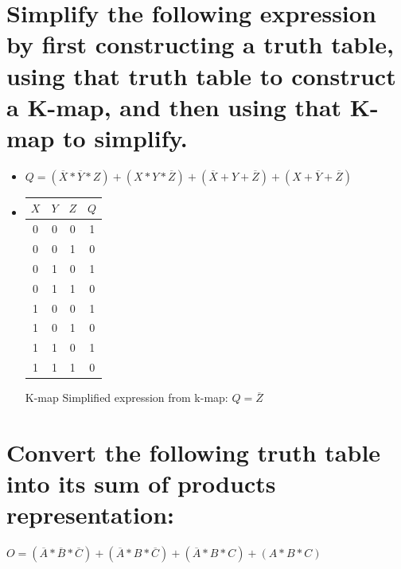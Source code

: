 \documentclass{article}
\begin{document}
\section{Simplify the following expression by first constructing a truth table, using that truth table to
construct a K-map, and then using that K-map to simplify.} 

\begin{itemize}
\large
    \item $Q = (\overline{X} * \overline{Y} * Z) + (X * Y * \overline{Z}) +
    (\overline{X} + Y + \overline{Z}) + (X + \overline{Y} + \overline{Z})$ \newline
    
  \item
    \begin{tabular}{ccC|c}
      $X$&$Y$&$Z$&$Q$&\\
      \hline 
      \textsc{0}&\textsc{0}&\textsc{0}&\textsc{1}\\
      \textsc{0}&\textsc{0}&\textsc{1}&\textsc{0}\\
      \textsc{0}&\textsc{1}&\textsc{0}&\textsc{1}\\
      \textsc{0}&\textsc{1}&\textsc{1}&\textsc{0}\\
      \textsc{1}&\textsc{0}&\textsc{0}&\textsc{1}\\
      \textsc{1}&\textsc{0}&\textsc{1}&\textsc{0}\\
      \textsc{1}&\textsc{1}&\textsc{0}&\textsc{1}\\
      \textsc{1}&\textsc{1}&\textsc{1}&\textsc{0}\\
    \end{tabular}
    
    K-map \newline
    \newline
    Simplified expression from k-map: $Q = \overline{Z} $
    
\end{itemize}

\section{Convert the following truth table into its sum of products representation:}

$O = (\overline{A} * \overline{B} * \overline{C}) + (\overline{A} * B * \overline{C}) + (\overline{A} * B * C) + (A * B * C)$
\end{document}
